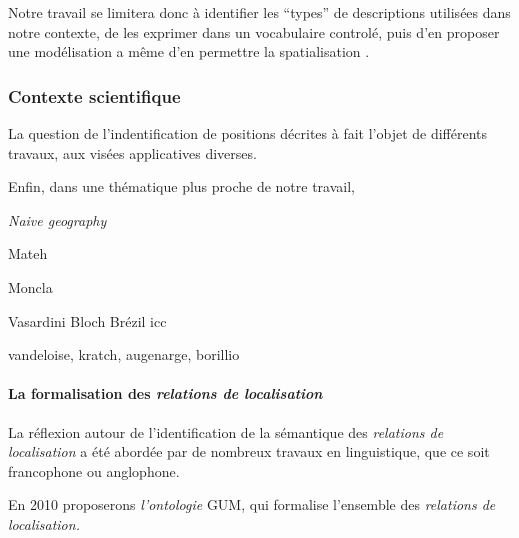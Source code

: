 Notre travail se limitera donc à identifier les \enquote{types} de
descriptions utilisées dans notre contexte, de les exprimer dans un
vocabulaire controlé, puis d'en proposer une modélisation a même d'en
permettre la spatialisation .

\subsubsection{Contexte scientifique}



La question de l'indentification de positions décrites à fait l'objet
de différents travaux, aux visées applicatives diverses.



Enfin, dans une thématique plus proche de notre travail,  

\emph{Naive geography} \autocite{Egenhofer1995}

Mateh

Moncla



Vasardini
Bloch
Brézil icc

vandeloise, kratch, augenarge, borillio 

\paragraph{La formalisation des \emph{relations de localisation}}

La réflexion autour de l'identification de la sémantique des
\emph{relations de localisation} a été abordée par de nombreux travaux
en linguistique, que ce soit francophone ou anglophone.

\autocite{Vandeloise1986}
\autocite{Borillo1998}

En 2010 \textcite{Bateman2010} proposerons \emph{l'ontologie} GUM, qui
formalise l'ensemble des \emph{relations de localisation.}

\autocite{Aurnague1997}

\autocite{Kracht2002}
\autocite{Aurnague1993}
\autocite{Mark1999}
\autocite{Freksa2018}
\autocite{Carlson2005}
\autocite{Lang1991}

\autocite{Hois2008}
\autocite{Frank1992}
\autocite{Moratz2008}
\autocite{Cohn2001}
\autocite{Kordjamshidi2012}
\autocite{Matsakis2010}
\autocite{Frank1997}
\autocite{Talmy2005}
\autocite{Freeman1975}
\autocite{Zelinsky-Wibbelt1993}
\autocite{Carlson2004}
\autocite{Gui-Wu2009}

